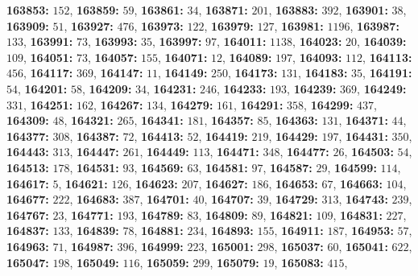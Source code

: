 \textsf{\bfseries 163853:} $152$, \textsf{\bfseries 163859:} $59$, \textsf{\bfseries 163861:} $34$, \textsf{\bfseries 163871:} $201$, \textsf{\bfseries 163883:} $392$, \textsf{\bfseries 163901:} $38$, \textsf{\bfseries 163909:} $51$, \textsf{\bfseries 163927:} $476$, \textsf{\bfseries 163973:} $122$, \textsf{\bfseries 163979:} $127$, \textsf{\bfseries 163981:} $1196$, \textsf{\bfseries 163987:} $133$, \textsf{\bfseries 163991:} $73$, \textsf{\bfseries 163993:} $35$, \textsf{\bfseries 163997:} $97$, \textsf{\bfseries 164011:} $1138$, \textsf{\bfseries 164023:} $20$, \textsf{\bfseries 164039:} $109$, \textsf{\bfseries 164051:} $73$, \textsf{\bfseries 164057:} $155$, \textsf{\bfseries 164071:} $12$, \textsf{\bfseries 164089:} $197$, \textsf{\bfseries 164093:} $112$, \textsf{\bfseries 164113:} $456$, \textsf{\bfseries 164117:} $369$, \textsf{\bfseries 164147:} $11$, \textsf{\bfseries 164149:} $250$, \textsf{\bfseries 164173:} $131$, \textsf{\bfseries 164183:} $35$, \textsf{\bfseries 164191:} $54$, \textsf{\bfseries 164201:} $58$, \textsf{\bfseries 164209:} $34$, \textsf{\bfseries 164231:} $246$, \textsf{\bfseries 164233:} $193$, \textsf{\bfseries 164239:} $369$, \textsf{\bfseries 164249:} $331$, \textsf{\bfseries 164251:} $162$, \textsf{\bfseries 164267:} $134$, \textsf{\bfseries 164279:} $161$, \textsf{\bfseries 164291:} $358$, \textsf{\bfseries 164299:} $437$, \textsf{\bfseries 164309:} $48$, \textsf{\bfseries 164321:} $265$, \textsf{\bfseries 164341:} $181$, \textsf{\bfseries 164357:} $85$, \textsf{\bfseries 164363:} $131$, \textsf{\bfseries 164371:} $44$, \textsf{\bfseries 164377:} $308$, \textsf{\bfseries 164387:} $72$, \textsf{\bfseries 164413:} $52$, \textsf{\bfseries 164419:} $219$, \textsf{\bfseries 164429:} $197$, \textsf{\bfseries 164431:} $350$, \textsf{\bfseries 164443:} $313$, \textsf{\bfseries 164447:} $261$, \textsf{\bfseries 164449:} $113$, \textsf{\bfseries 164471:} $348$, \textsf{\bfseries 164477:} $26$, \textsf{\bfseries 164503:} $54$, \textsf{\bfseries 164513:} $178$, \textsf{\bfseries 164531:} $93$, \textsf{\bfseries 164569:} $63$, \textsf{\bfseries 164581:} $97$, \textsf{\bfseries 164587:} $29$, \textsf{\bfseries 164599:} $114$, \textsf{\bfseries 164617:} $5$, \textsf{\bfseries 164621:} $126$, \textsf{\bfseries 164623:} $207$, \textsf{\bfseries 164627:} $186$, \textsf{\bfseries 164653:} $67$, \textsf{\bfseries 164663:} $104$, \textsf{\bfseries 164677:} $222$, \textsf{\bfseries 164683:} $387$, \textsf{\bfseries 164701:} $40$, \textsf{\bfseries 164707:} $39$, \textsf{\bfseries 164729:} $313$, \textsf{\bfseries 164743:} $239$, \textsf{\bfseries 164767:} $23$, \textsf{\bfseries 164771:} $193$, \textsf{\bfseries 164789:} $83$, \textsf{\bfseries 164809:} $89$, \textsf{\bfseries 164821:} $109$, \textsf{\bfseries 164831:} $227$, \textsf{\bfseries 164837:} $133$, \textsf{\bfseries 164839:} $78$, \textsf{\bfseries 164881:} $234$, \textsf{\bfseries 164893:} $155$, \textsf{\bfseries 164911:} $187$, \textsf{\bfseries 164953:} $57$, \textsf{\bfseries 164963:} $71$, \textsf{\bfseries 164987:} $396$, \textsf{\bfseries 164999:} $223$, \textsf{\bfseries 165001:} $298$, \textsf{\bfseries 165037:} $60$, \textsf{\bfseries 165041:} $622$, \textsf{\bfseries 165047:} $198$, \textsf{\bfseries 165049:} $116$, \textsf{\bfseries 165059:} $299$, \textsf{\bfseries 165079:} $19$, \textsf{\bfseries 165083:} $415$, 
